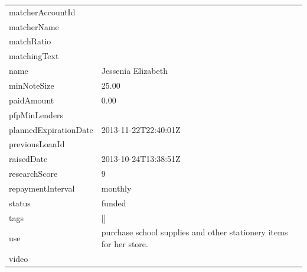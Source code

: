 \begin{longtable}{|p{}|p{}|}
    matcherAccountId                     &                                                                     \\
    matcherName                          &                                                                     \\
    matchRatio                           &                                                                     \\
    matchingText                         &                                                                     \\
    name                                 & Jessenia Elizabeth                                                  \\
    minNoteSize                          & 25.00                                                               \\
    paidAmount                           & 0.00                                                                \\
    pfpMinLenders                        &                                                                     \\
    plannedExpirationDate                & 2013-11-22T22:40:01Z                                                \\
    previousLoanId                       &                                                                     \\
    raisedDate                           & 2013-10-24T13:38:51Z                                                \\
    researchScore                        & 9                                                                   \\
    repaymentInterval                    & monthly                                                             \\
    status                               & funded                                                              \\
    tags                                 & {[}{]}                                                              \\
    use                                  & purchase school supplies and other stationery items for her
    store.                                                                                                     \\
    video                                &                                                                     \\

\end{longtable}
